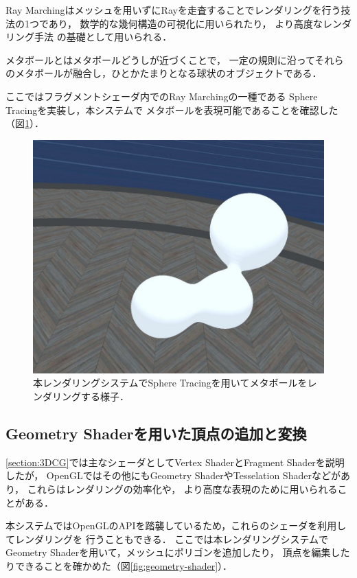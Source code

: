 Ray Marchingはメッシュを用いずにRayを走査することでレンダリングを行う技法の1つであり，
数学的な幾何構造の可視化\cite{ray-marching-math}に用いられたり，
より高度なレンダリング手法\cite{ray-marching-advanced1}\cite{ray-marching-advanced2}
の基礎として用いられる．

メタボール\cite{meta-ball}とはメタボールどうしが近づくことで，
一定の規則に沿ってそれらのメタボールが融合し，ひとかたまりとなる球状のオブジェクトである．

ここではフラグメントシェーダ内でのRay Marchingの一種である
Sphere Tracing\cite{sphere-tracing}を実装し，本システムで
メタボールを表現可能であることを確認した（図\ref{fig:meta-ball}）．

\begin{figure}[htbp]
  \centering
  \includegraphics[keepaspectratio, width=0.7\linewidth]{figures/meta-ball.png}
  \caption{
    本レンダリングシステムでSphere Tracingを用いてメタボールをレンダリングする様子．
  }
  \label{fig:meta-ball}
\end{figure}

\subsection{Geometry Shaderを用いた頂点の追加と変換}

\ref{section:3DCG}では主なシェーダとしてVertex ShaderとFragment Shaderを説明したが，
OpenGLではその他にもGeometry ShaderやTesselation Shaderなどがあり，
これらはレンダリングの効率化\cite{geometry-shader-research1}や，
より高度な表現\cite{geometry-shader-research2}のために用いられることがある．


本システムではOpenGLのAPIを踏襲しているため，これらのシェーダを利用してレンダリングを
行うこともできる．
ここでは本レンダリングシステムでGeometry Shaderを用いて，メッシュにポリゴンを追加したり，
頂点を編集したりできることを確かめた（図\ref{fig:geometry-shader}）．

